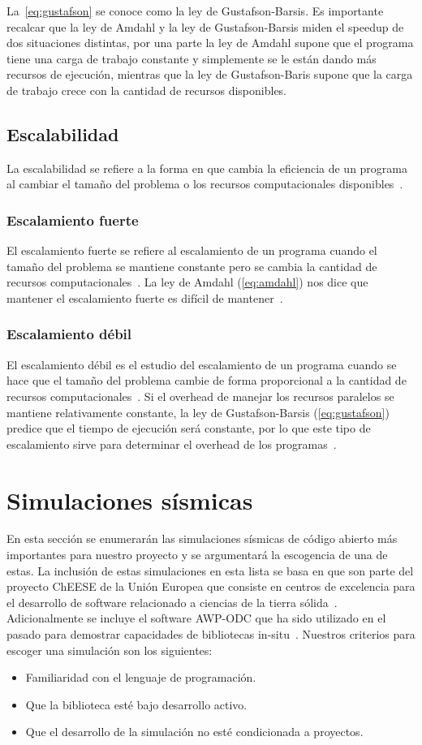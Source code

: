La~\cref{eq:gustafson} se conoce como la ley de Gustafson-Barsis. Es importante recalcar que la ley de Amdahl y la ley de Gustafson-Barsis miden el speedup de dos situaciones distintas, por una parte la ley de Amdahl supone que el programa tiene una carga de trabajo constante y simplemente se le están dando más recursos de ejecución, mientras que la ley de Gustafson-Baris supone que la carga de trabajo crece con la cantidad de recursos disponibles.
\subsection{Escalabilidad}
La escalabilidad se refiere a la forma en que cambia la eficiencia de un programa al cambiar el tamaño del problema o los recursos computacionales disponibles~\cite{Pacheco2011-sb}.
\subsubsection{Escalamiento fuerte}
El escalamiento fuerte se refiere al escalamiento de un programa cuando el tamaño del problema se mantiene constante pero se cambia la cantidad de recursos computacionales~\cite{Pacheco2011-sb}. La ley de Amdahl (\cref{eq:amdahl}) nos dice que mantener el escalamiento fuerte es difícil de mantener~\cite{Mattson2019-vv}.
\subsubsection{Escalamiento débil}
El escalamiento débil es el estudio del escalamiento de un programa cuando se hace que el tamaño del problema cambie de forma proporcional a la cantidad de recursos computacionales~\cite{Pacheco2011-sb}. Si el overhead de manejar los recursos paralelos se mantiene relativamente constante, la ley de Gustafson-Barsis (\cref{eq:gustafson}) predice que el tiempo de ejecución será constante, por lo que este tipo de escalamiento sirve para determinar el overhead de los programas~\cite{Mattson2019-vv}.
\section{Simulaciones sísmicas}
En esta sección se enumerarán las simulaciones sísmicas de código abierto más importantes para nuestro proyecto y se argumentará la escogencia de una de estas. La inclusión de estas simulaciones en esta lista se basa en que son parte del proyecto ChEESE de la Unión Europea que consiste en centros de excelencia para el desarrollo de software relacionado a ciencias de la tierra sólida~\cite{Folch2023}. Adicionalmente se incluye el software AWP-ODC que ha sido utilizado en el pasado para demostrar capacidades de bibliotecas in-situ~\cite{mu_-situ_2019}. Nuestros criterios para escoger una simulación son los siguientes:
\begin{itemize}
    \item Familiaridad con el lenguaje de programación.
    \item Que la biblioteca esté bajo desarrollo activo.
    \item Que el desarrollo de la simulación no esté condicionada a proyectos.
\end{itemize}

